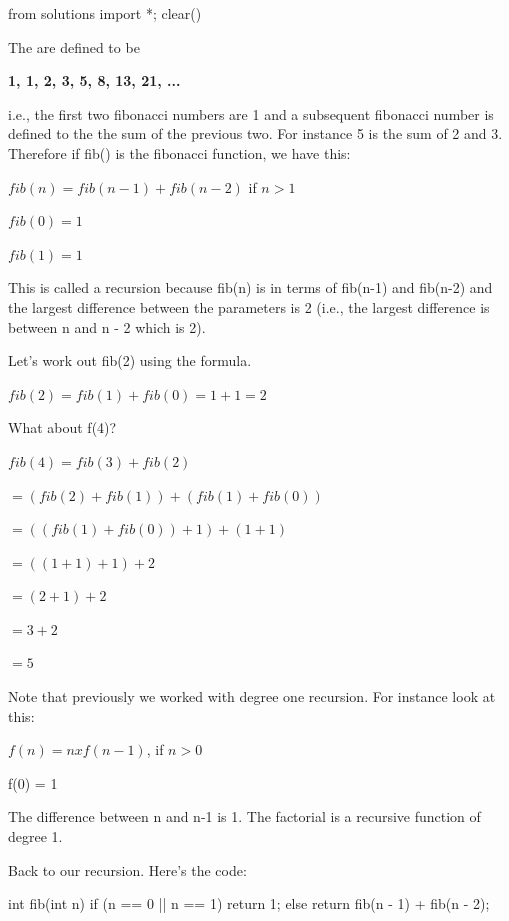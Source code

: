 \begin{python0}
from solutions import *; clear()
\end{python0}

The  are defined to be

\textbf{1, 1, 2, 3, 5, 8, 13, 21, ...}

i.e., the first two fibonacci numbers are 1 and a subsequent fibonacci
number is defined to the the sum of the previous two. For instance 5 is
the sum of 2 and 3. Therefore if fib() is the fibonacci function, we
have this:

$fib(n) = fib(n-1) + fib(n-2)$ if $n > 1$

$fib(0) = 1$

$fib(1) = 1$

This is called a  recursion because fib(n) is in
terms of fib(n-1) and fib(n-2) and the largest difference between the
parameters is 2 (i.e., the largest difference is between n and n - 2 which is 2).



Let's work out fib(2) using the formula.

$fib(2) = fib(1) + fib(0) = 1 + 1 = 2$

What about f(4)?

$fib(4) = fib(3) + fib(2)$

$= (fib(2) + fib(1)) + (fib(1) + fib(0))$

$= ((fib(1) + fib(0)) + 1) + (1 + 1)$

$= ((1 + 1) + 1) + 2$

$= (2 + 1) + 2$

$= 3 + 2$

$= 5$

Note that previously we worked with degree one recursion. For instance
look at this:

$f(n) = n x f(n-1)$, if $n > 0$

f(0) = 1

The difference between n and n-1 is 1. The factorial is a recursive
function of degree 1.

Back to our recursion. Here's the code:

\begin{consolethree}[escapeinside=||]
int fib(int n)
{
    if (n == 0 || n == 1)
        return 1;
    else
        return fib(n - 1) + fib(n - 2);
}
\end{consolethree}






